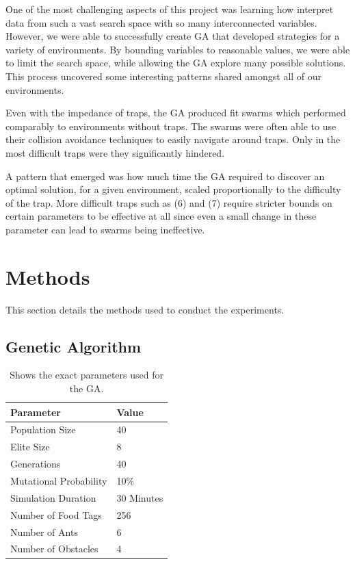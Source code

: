 \documentclass{acm_proc_article-sp}
\begin{document}
One of the most challenging aspects of this project was learning how interpret data from such a vast search space with so many interconnected variables. However, we were able to successfully create GA that developed strategies for a variety of environments. By bounding variables to reasonable values, we were able to limit the search space, while allowing the GA explore many possible solutions. This process uncovered some interesting patterns shared amongst all of our environments.

Even with the impedance of traps, the GA produced fit swarms which performed comparably to environments without traps. The swarms were often able to use their collision avoidance techniques to easily navigate around traps. Only in the most difficult traps were they significantly hindered.

A pattern that emerged was how much time the GA required to discover an optimal solution, for a given environment, scaled proportionally to the difficulty of the trap. More difficult traps such as (6) and (7) require stricter bounds on certain parameters to be effective at all since even a small change in these parameter can lead to swarms being ineffective.

\section{Methods}
This section details the methods used to conduct the experiments.

\subsection{Genetic Algorithm}

\begin{table}[h]
\begin{tabular}{@{}ll@{}}
\toprule
Parameter              & Value      \\ \midrule
Population Size        & 40         \\
Elite Size             & 8          \\
Generations            & 40         \\
Mutational Probability & 10\%       \\
Simulation Duration    & 30 Minutes \\
Number of Food Tags    & 256        \\ 
Number of Ants         & 6          \\ 
Number of Obstacles    & 4          \bottomrule
\end{tabular}
\caption{Shows the exact parameters used for the GA.}
\label{table:gaParams}
\end{table}
\end{document}
